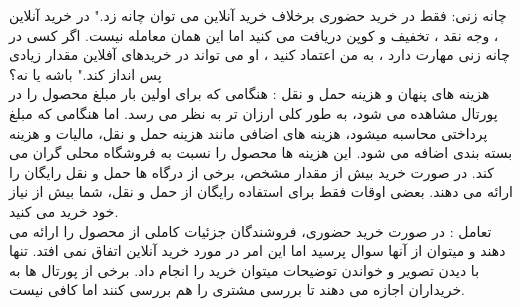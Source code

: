 \documentclass[14pt]{article}
\begin{document}
چانه زنی: فقط در خرید حضوری برخلاف خرید آنلاین می توان چانه زد." در خرید آنلاین ، وجه نقد ، تخفیف و کوپن دریافت می کنید اما این همان معامله نیست. اگر کسی در چانه زنی مهارت دارد ، به من اعتماد کنید ، او می تواند در خریدهای آفلاین مقدار زیادی پس انداز کند." باشه یا نه؟\\
هزینه های پنهان و هزینه حمل و نقل : هنگامی که برای اولین بار مبلغ محصول را در پورتال مشاهده می شود، به طور کلی ارزان تر به نظر می رسد. اما هنگامی که مبلغ پرداختی محاسبه میشود، هزینه های اضافی مانند هزینه حمل و نقل، مالیات و هزینه بسته بندی اضافه می شود. این هزینه ها محصول را نسبت به فروشگاه محلی گران می کند. در صورت خرید بیش از مقدار مشخص، برخی از درگاه ها حمل و نقل رایگان را ارائه می دهند. بعضی اوقات فقط برای استفاده رایگان از حمل و نقل، شما بیش از نیاز خود خرید می کنید.\\
تعامل : در صورت خرید حضوری، فروشندگان جزئیات کاملی از محصول را ارائه می دهند و میتوان از آنها سوال پرسید اما این امر در مورد خرید آنلاین اتفاق نمی افتد. تنها با دیدن تصویر و خواندن توضیحات میتوان خرید را انجام داد. برخی از پورتال ها به خریداران اجازه می دهند تا بررسی مشتری را هم بررسی کنند اما کافی نیست.
\end{document}
